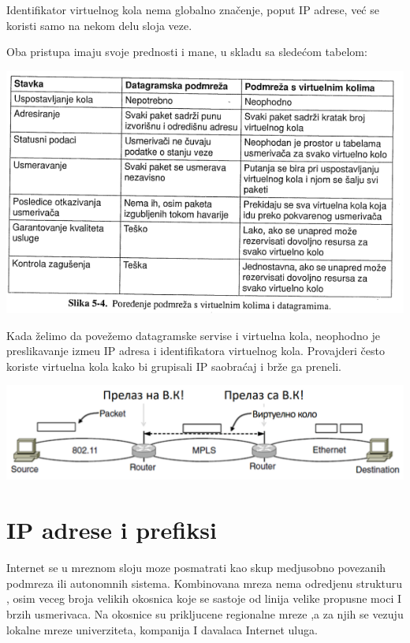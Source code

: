 \documentclass{article} %
\begin{document}
Identifikator virtuelnog kola nema globalno zna\v{c}enje, poput IP adrese, ve\'{c} se koristi samo na nekom delu sloja veze.

Oba pristupa imaju svoje prednosti i mane, u skladu sa slede\'{c}om tabelom:

\begin{center}
\includegraphics[scale=0.5]{datagrami-vk}
\end{center}

Kada \v{z}elimo da pove\v{z}emo datagramske servise i virtuelna kola, neophodno je preslikavanje izme\dj{}u IP adresa i identifikatora virtuelnog kola. Provajderi \v{c}esto koriste virtuelna kola kako bi grupisali IP saobra\'{c}aj i br\v{z}e ga preneli.

\begin{center}
\includegraphics[scale=0.3]{datagrami-vk-kombinacija}
\end{center}

\section{IP adrese i prefiksi}
Internet se u mreznom sloju moze posmatrati kao skup medjusobno povezanih podmreza ili autonomnih sistema. Kombinovana mreza nema odredjenu strukturu , osim veceg broja velikih okosnica koje se sastoje od linija velike propusne moci I brzih usmerivaca. Na okosnice su prikljucene regionalne mreze ,a za njih se vezuju lokalne mreze univerziteta, kompanija I davalaca Internet uluga.\\
\end{document}
